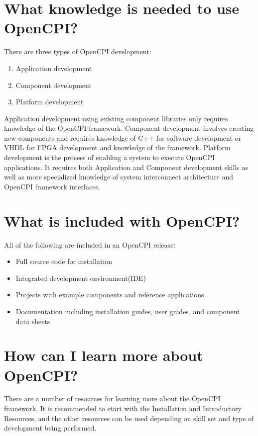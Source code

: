\section*{What knowledge is needed to use OpenCPI?}
There are three types of OpenCPI development:
\begin{enumerate}
\item Application development
\item Component development
\item Platform development
\end{enumerate}

Application development using existing component libraries only requires knowledge of the OpenCPI framework. Component development involves creating new components and requires knowledge of C++ for software development or VHDL for FPGA development and knowledge of the framework. Platform development is the process of enabling a system to execute OpenCPI applications. It requires both Application and Component development skills as well as more specialized knowledge of system interconnect architecture and OpenCPI framework interfaces.

\section*{What is included with OpenCPI?}
All of the following are included in an OpenCPI release:
\begin{itemize}
\item Full source code for installation
\item Integrated development environment(IDE)
\item Projects with example components and reference applications
\item Documentation including installation guides, user guides, and component data sheets
\end{itemize}

\section*{How can I learn more about OpenCPI?}
There are a number of resources for learning more about the OpenCPI framework. It is recommended to start with the Installation and Introductory Resources, and the other resources can be used depending on skill set and type of development being performed.
